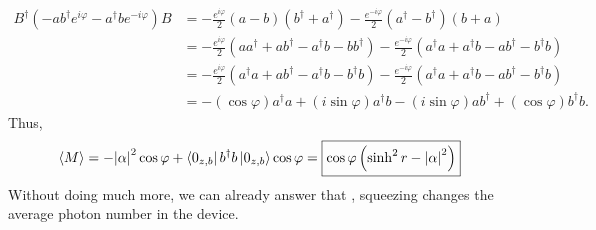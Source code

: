 \documentclass{article}
\theoremstyle{definition}
\newcommand{\al}{\alpha}
\newcommand{\f}[2]{\frac{#1}{#2}}
\newcommand{\lp}{\left(}
\newcommand{\rp}{\right)}
\begin{document}
\begin{enumerate}[label=(\alph*)]
\begin{align*}
B^\dagger (-a b^\dagger e^{i\varphi} - a^\dagger b e^{-i\varphi}) B 
&= -\f{e^{i\varphi}}{2}(a-b) (b^\dagger + a^\dagger) -\f{e^{-i\varphi}}{2}(a^\dagger - b^\dagger) (b + a) \\
&= -\f{e^{i\varphi}}{2}(aa^\dagger +ab^\dagger - a^\dagger b - bb^\dagger) - \f{e^{-i\varphi}}{2}(a^\dagger a + a^\dagger b - ab^\dagger - b^\dagger b)\\
&= -\f{e^{i\varphi}}{2}(a^\dagger a +ab^\dagger - a^\dagger b - b^\dagger b) - \f{e^{-i\varphi}}{2}(a^\dagger a + a^\dagger b - ab^\dagger - b^\dagger b) \\
&=
-(\cos\varphi) a^\dagger a  
+ 
(i\sin\varphi) a^\dagger b 
- 
(i\sin\varphi) ab^\dagger 
+ 
(\cos\varphi) b^\dagger b.
\end{align*}
Thus,
\begin{align*}
\langle M \rangle = -\abs{\al}^2 \cos\varphi + \bra{0_{z,b}} b^\dagger b \ket{0_{z,b}} \cos \varphi 
= 
\boxed{\cos\varphi \lp \sinh^2 r - \abs{\al}^2 \rp}
\end{align*}
Without doing much more, we can already answer that , squeezing changes the average photon number in the device. \\



\end{enumerate}
\end{document}
